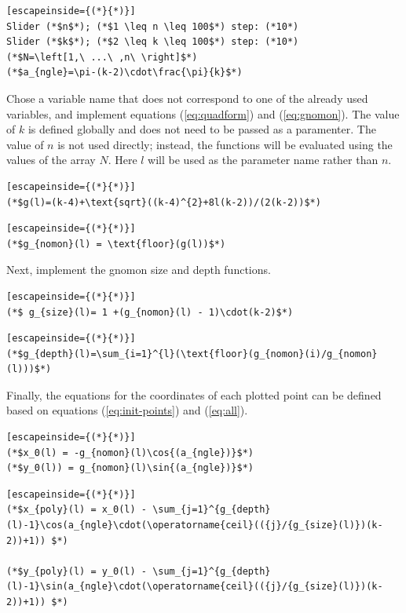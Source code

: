 \documentclass[notitlepage]{report}
\begin{document}
\begin{lstlisting}[escapeinside={(*}{*)}]
Slider (*$n$*); (*$1 \leq n \leq 100$*) step: (*10*)
Slider (*$k$*); (*$2 \leq k \leq 100$*) step: (*10*)
(*$N=\left[1,\ ...\ ,n\ \right]$*)
(*$a_{ngle}=\pi-(k-2)\cdot\frac{\pi}{k}$*)
\end{lstlisting}

Chose a variable name that does not correspond to one of the already used variables, and implement equations (\ref{eq:quadform}) and (\ref{eq:gnomon}). The value of $k$ is defined globally and does not need to be passed as a paramenter. The value of $n$ is not used directly; instead, the functions will be evaluated using the values of the array $N$. Here $l$ will be used as the parameter name rather than $n$. 

\begin{lstlisting}[escapeinside={(*}{*)}]
(*$g(l)=(k-4)+\text{sqrt}((k-4)^{2}+8l(k-2))/(2(k-2))$*)
\end{lstlisting}

\begin{lstlisting}[escapeinside={(*}{*)}]
(*$g_{nomon}(l) = \text{floor}(g(l))$*)  
\end{lstlisting}

Next, implement the gnomon size and depth functions.

\begin{lstlisting}[escapeinside={(*}{*)}]
(*$ g_{size}(l)= 1 +(g_{nomon}(l) - 1)\cdot(k-2)$*)
\end{lstlisting}

\begin{lstlisting}[escapeinside={(*}{*)}]
(*$g_{depth}(l)=\sum_{i=1}^{l}(\text{floor}(g_{nomon}(i)/g_{nomon}(l)))$*)
\end{lstlisting}

Finally, the equations for the coordinates of each plotted point can be defined based on equations (\ref{eq:init-points}) and (\ref{eq:all}).


\begin{lstlisting}[escapeinside={(*}{*)}]
(*$x_0(l) = -g_{nomon}(l)\cos{(a_{ngle})}$*)
(*$y_0(l)) = g_{nomon}(l)\sin{(a_{ngle})}$*)
\end{lstlisting}


\begin{lstlisting}[escapeinside={(*}{*)}]
(*$x_{poly}(l) = x_0(l) - \sum_{j=1}^{g_{depth}(l)-1}\cos(a_{ngle}\cdot(\operatorname{ceil}(({j}/{g_{size}(l)})(k-2))+1)) $*)

(*$y_{poly}(l) = y_0(l) - \sum_{j=1}^{g_{depth}(l)-1}\sin(a_{ngle}\cdot(\operatorname{ceil}(({j}/{g_{size}(l)})(k-2))+1)) $*)
\end{lstlisting}
\end{document}
